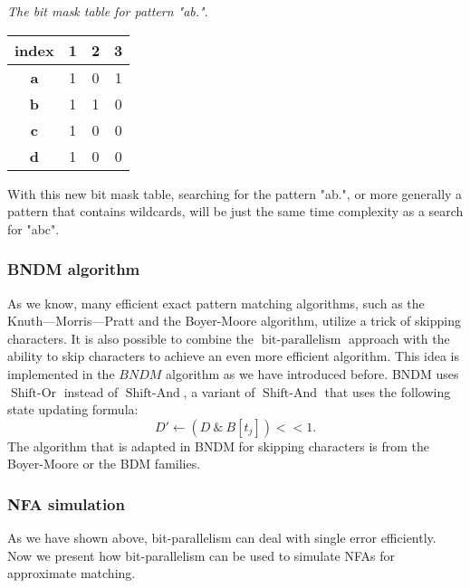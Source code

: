 \begin{example}\emph{The bit mask table for pattern "ab."}.
	\begin{table}[H]
		\centering
		\begin{tabular}{|c|c|c|c|}
			\hline
			index      & 1                        & 2                        & 3                        \\ \hline
			\textbf{a} & {\color{red} 1}                   & 0                        & {\color[HTML]{3531FF} 1} \\ \hline
			\textbf{b} &  {\color{red} 1}                    & {\color[HTML]{3531FF} 1} & 0                        \\ \hline
			\textbf{c} & {\color[HTML]{3531FF} 1} & 0                        & 0                        \\ \hline
			\textbf{d} &{\color{red} 1}                    & 0                        & 0                        \\ \hline
		\end{tabular}
		\label{table-bitmask2}
	\end{table}
\end{example}

With this new bit mask table, searching for the pattern "ab.", or more generally a pattern that contains wildcards, will be just the same time complexity as a search for "abc". 

\subsubsection{BNDM algorithm}
As we know, many efficient exact pattern matching algorithms, such as the Knuth--–Morris--–Pratt and the Boyer-Moore algorithm, utilize a trick of skipping characters. It is also possible to combine the $\operatorname{bit-parallelism}$ approach with the ability to skip characters to achieve an even more efficient algorithm. This idea is implemented in the $BNDM$ algorithm as we have introduced before. BNDM uses $\operatorname{Shift-Or}$ instead of $\operatorname{Shift-And}$, a variant of $\operatorname{Shift-And}$ that uses the following state updating formula:  
$$ D' \leftarrow  (D \ \& \ B[t_j]) << 1 .$$ The algorithm that is adapted in BNDM for skipping characters is from the Boyer-Moore or the BDM families\cite{crochemore1994text}.


\subsubsection{NFA simulation}
As we have shown above, bit-parallelism can deal with single error efficiently.
Now we present how bit-parallelism can be used to simulate NFAs for approximate matching. 

